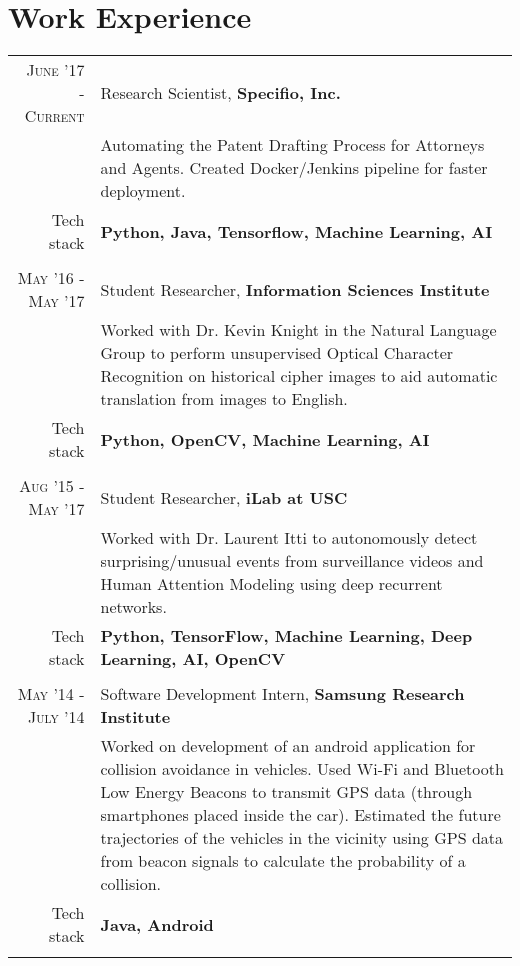 \section{Work Experience}
\renewcommand{\arraystretch}{0.85}%
\begin{tabular}{r|p{13cm}}
\textsc{June '17 - Current} & Research Scientist, \textbf{Specifio, Inc.} \\
& \small{Automating the Patent Drafting Process for Attorneys and Agents. Created Docker/Jenkins pipeline for faster deployment.}\\
\small{Tech stack} &\footnotesize{\textbf{Python, Java, Tensorflow, Machine Learning, AI}} \\
\multicolumn{2}{c}{} \\

\textsc{May '16 - May '17} & Student Researcher, \textbf{Information Sciences Institute} \\
& \small{Worked with Dr. Kevin Knight in the Natural Language Group to perform unsupervised Optical Character Recognition on historical cipher images to aid automatic translation from images to English.}\\
\small{Tech stack} &\footnotesize{\textbf{Python, OpenCV, Machine Learning, AI}} \\
\multicolumn{1}{c}{} \\

\textsc{Aug '15 - May '17} & Student Researcher, \textbf{iLab at USC} \\
& \small{Worked with Dr. Laurent Itti to autonomously detect surprising/unusual events from surveillance videos and Human Attention Modeling using deep recurrent networks.}\\
\small{Tech stack} &\footnotesize{\textbf{Python, TensorFlow, Machine Learning, Deep Learning, AI, OpenCV}} \\
\multicolumn{1}{c}{} \\

\textsc{May '14 - July '14 } & Software Development Intern, \textbf{Samsung Research Institute} \\
& \small{Worked on development of an android application for collision avoidance in vehicles. Used Wi-Fi and Bluetooth Low Energy Beacons to transmit GPS data (through smartphones placed inside the car). Estimated the future trajectories of the vehicles in the vicinity using GPS data from beacon signals to calculate the probability of a collision.}\\
\small{Tech stack} &\footnotesize{\textbf{Java, Android}} \\
\multicolumn{2}{c}{}


\end{tabular}
